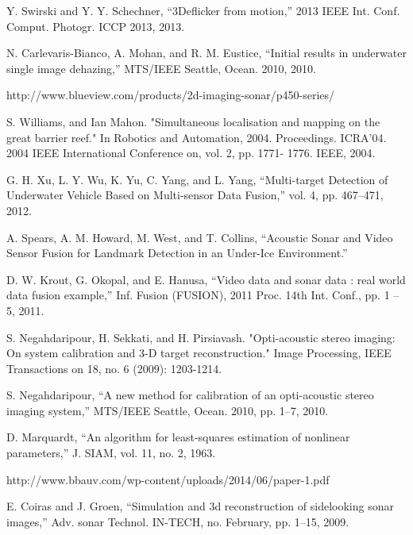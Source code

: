 \documentclass[a4paper]{IEEEtran}
\begin{document}
\begin{thebibliography}{1}

Y. Swirski and Y. Y. Schechner, “3Deflicker from motion,” 2013 IEEE Int. Conf. Comput. Photogr. ICCP 2013, 2013.

N. Carlevaris-Bianco, A. Mohan, and R. M. Eustice, “Initial results in underwater single image dehazing,” MTS/IEEE Seattle, Ocean. 2010, 2010.

http://www.blueview.com/products/2d-imaging-sonar/p450-series/

S. Williams, and Ian Mahon. "Simultaneous localisation and mapping on the great barrier reef." In Robotics and Automation, 2004. Proceedings. ICRA'04. 2004 IEEE International Conference on, vol. 2, pp. 1771- 1776. IEEE, 2004. 

G. H. Xu, L. Y. Wu, K. Yu, C. Yang, and L. Yang, “Multi-target Detection of Underwater Vehicle Based on Multi-sensor Data Fusion,” vol. 4, pp. 467–471, 2012.

A. Spears, A. M. Howard, M. West, and T. Collins, “Acoustic Sonar and Video Sensor Fusion for Landmark Detection in an Under-Ice Environment.”

D. W. Krout, G. Okopal, and E. Hanusa, “Video data and sonar data : real world data fusion example,” Inf. Fusion (FUSION), 2011 Proc. 14th Int. Conf., pp. 1 – 5, 2011. 

S. Negahdaripour, H. Sekkati, and H. Pirsiavash. "Opti-acoustic stereo imaging: On system calibration and 3-D target reconstruction." Image Processing, IEEE Transactions on 18, no. 6 (2009): 1203-1214.

S. Negahdaripour, “A new method for calibration of an opti-acoustic stereo imaging system,” MTS/IEEE Seattle, Ocean. 2010, pp. 1–7, 2010.

D. Marquardt, “An algorithm for least-squares estimation of nonlinear parameters,” J. SIAM, vol. 11, no. 2, 1963.

http://www.bbauv.com/wp-content/uploads/2014/06/paper-1.pdf

E. Coiras and J. Groen, “Simulation and 3d reconstruction of sidelooking sonar images,” Adv. sonar Technol. IN-TECH, no. February, pp. 1–15, 2009.


\end{thebibliography}
\end{document}
